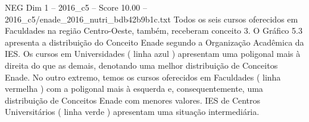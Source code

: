 \begin{textsample}{NEG Dim 1 – 2016\_c5 – Score 10.00 – 2016\_c5/enade\_2016\_nutri\_bdb42b9b1c.txt}
Todos os seis cursos oferecidos em Faculdades na região Centro-Oeste, também, receberam conceito 3.
O Gráfico 5.3 apresenta a distribuição do Conceito Enade segundo a Organização Acadêmica da IES.
Os cursos em Universidades ( linha azul ) apresentam uma poligonal mais à direita do que as demais, denotando uma melhor distribuição de Conceitos Enade.
No outro extremo, temos os cursos oferecidos em Faculdades ( linha vermelha ) com a poligonal mais à esquerda e, consequentemente, uma distribuição de Conceitos Enade com menores valores.
IES de Centros Universitários ( linha verde ) apresentam uma situação intermediária.

\end{textsample}

